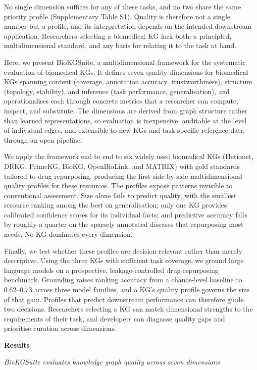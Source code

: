 No single dimension suffices for any of these tasks, and no two share the same priority profile (Supplementary Table S1). Quality is therefore not a single number but a profile, and its interpretation depends on the intended downstream application. Researchers selecting a biomedical KG lack both: a principled, multidimensional standard, and any basis for relating it to the task at hand.

Here, we present BioKGSuite, a multidimensional framework for the systematic evaluation of biomedical KGs. It defines seven quality dimensions for biomedical KGs spanning content (coverage, annotation accuracy, trustworthiness), structure (topology, stability), and inference (task performance, generalisation), and operationalises each through concrete metrics that a researcher can compute, inspect, and substitute. The dimensions are derived from graph structure rather than learned representations, so evaluation is inexpensive, auditable at the level of individual edges, and extensible to new KGs and task-specific reference data through an open pipeline.

We apply the framework end to end to six widely used biomedical KGs (Hetionet, DRKG, PrimeKG, BioKG, OpenBioLink, and MATRIX) with gold standards tailored to drug repurposing, producing the first side-by-side multidimensional quality profiles for these resources. The profiles expose patterns invisible to conventional assessment. Size alone fails to predict quality, with the smallest resource ranking among the best on generalisation; only one KG provides calibrated confidence scores for its individual facts; and predictive accuracy falls by roughly a quarter on the sparsely annotated diseases that repurposing most needs. No KG dominates every dimension.

Finally, we test whether these profiles are decision-relevant rather than merely descriptive. Using the three KGs with sufficient task coverage, we ground large language models on a prospective, leakage-controlled drug-repurposing benchmark. Grounding raises ranking accuracy from a chance-level baseline to 0.62--0.73 across three model families, and a KG's quality profile governs the size of that gain. Profiles that predict downstream performance can therefore guide two decisions. Researchers selecting a KG can match dimensional strengths to the requirements of their task, and developers can diagnose quality gaps and prioritise curation across dimensions.

\textbf{Results}

\emph{BioKGSuite evaluates knowledge graph quality across seven dimensions}


